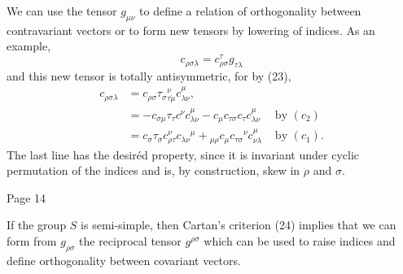 We can use the tensor \(g_{\mu \nu}\) to define a relation of orthogonality
between contravariant vectors or to form new tensors by lowering of indices. As
an example,
\begin{equation}\label{eq:25}
c_{\rho \sigma \lambda}=c_{\rho \sigma}^{\tau} g_{\tau \lambda}
\end{equation}
and this new tensor is totally antisymmetric, for by (23),
\[
\begin{array}{rlr}
c_{\rho \sigma \lambda} & =c_{\rho \sigma} \tau_\sigma{ }_{\tau \dot{\mu}}^\nu c_{\lambda \nu}^\mu, & \\
& =-c_{\sigma \mu} \tau_\tau c^\nu c_{\lambda \nu}^\mu-c_\mu c_{\tau \sigma} c_\tau c_{\lambda \nu}^\mu & \text { by }\left(c_2\right) \\
& =c_\sigma \tau_\sigma c_{\rho \tau}^\nu c_{\lambda \nu}{ }^\mu+{ }_{\mu \rho} c_\mu c_{\tau \sigma}{ }^\nu c_{\nu \lambda}^\mu & \text { by }\left(c_1\right) .
\end{array}
\]
The last line has the desiréd property, since it is invariant under cyclic permutation of the indices and is, by construction, skew in \(\rho\) and \(\sigma\).

Page 14

If the group \(S\) is semi-simple, then Cartan's criterion (24) implies that we
can form from \(g_{\rho \sigma}\) the reciprocal tensor \(g^{\rho \sigma}\)
which can be used to raise indices and define orthogonality between covariant vectors.

